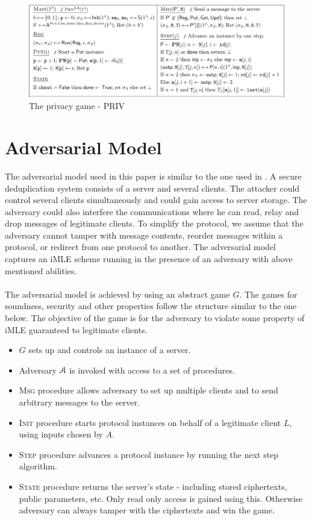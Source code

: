 \begin{figure}[H]
	\centering
	\includegraphics[width=\textwidth]{priv}
	\caption{The privacy game - PRIV \cite{imle}}
\end{figure}

	
	\section{Adversarial Model}
	The adversarial model used in this paper is similar to the one used in \cite{imle}.
	A secure deduplication system consists of a server and several clients. The attacker could control several clients simultaneously and could gain access to server storage. The adversary could also interfere the communications where he can read, relay and drop messages of legitimate clients. To simplify the protocol, we assume that the adversary cannot tamper with message contents, reorder messages within a protocol, or redirect from one protocol to another. The adversarial model captures an iMLE scheme running in the presence of an adversary with above mentioned abilities.
	\\ \\ The adversarial model is achieved by using an abstract game $G$. The games for soundness, security and other properties follow the structure similar to the one below. The objective of the game is for the adversary to violate some property of iMLE guaranteed to legitimate clients. 
	\begin{itemize}
		\item $G$ sets up and controls an instance of a server.
		\item Adversary $\mathcal{A}$ is invoked with access to a set of procedures.
		\item \textsc{Msg} procedure allows adversary to set up multiple clients and to send arbitrary messages to the server.
		\item \textsc{Init} procedure starts protocol instances on behalf of a legitimate client $L$, using inputs chosen by $A$.
		\item \textsc{Step} procedure advances a  protocol instance by running the next step algorithm.
		\item \textsc{State} procedure returns the server's state - including stored ciphertexts, public parameters, etc. Only read only access is gained using this. Otherwise adversary can always tamper with the ciphertexts and win the game.
	\end{itemize}
